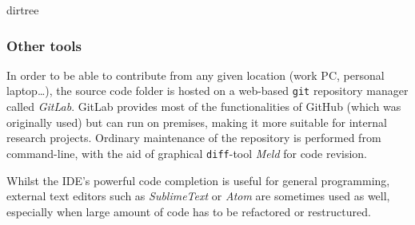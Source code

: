 dirtree



\subsubsection{Other tools}
In order to be able to contribute from any given location (work PC, personal laptop\dots), the source code folder is hosted on a web-based \texttt{git} repository manager called \emph{GitLab}.
GitLab provides most of the functionalities of GitHub (which was originally used) but can run on premises, making it more suitable for internal research projects.
Ordinary maintenance of the repository is performed from command-line, with the aid of graphical \texttt{diff}-tool \emph{Meld} for code revision.

Whilst the IDE's powerful code completion is useful for general programming, external text editors such as \emph{SublimeText} or \emph{Atom} are sometimes used as well, especially when large amount of code has to be refactored or restructured.
